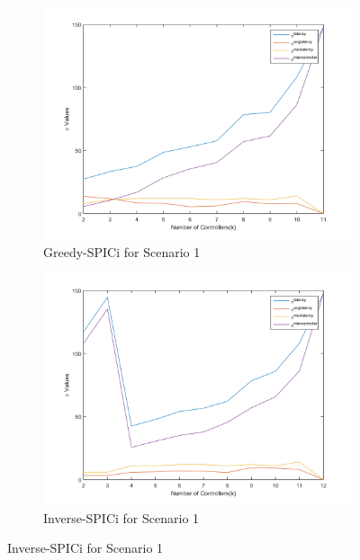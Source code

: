 \documentclass[10pt]{extarticle}
\begin{document}
\begin{figure}
\begin{subfigure}{0.5\linewidth}
			\includegraphics[width=\linewidth]{gspici_1.png}
			\caption{Greedy-SPICi for Scenario 1}
			\label{fig:gspici1}
		\end{subfigure}
		\begin{subfigure}{0.5\linewidth}
			\includegraphics[width=\linewidth]{ispici_1.png}
			\caption{Inverse-SPICi for Scenario 1}
			\label{fig:ispici1}
		\end{subfigure}
	\end{figure}
\end{document}
